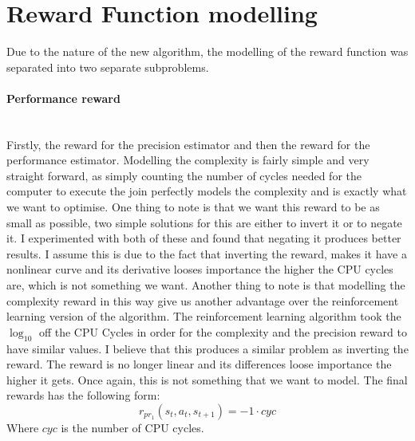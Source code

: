 \section{Reward Function modelling}
Due to the nature of the new algorithm, the modelling of the reward function was separated into two separate subproblems.
\paragraph{Performance reward}\mbox{}\\
Firstly, the reward for the precision estimator and then the reward for the performance estimator. Modelling the complexity is fairly simple and very straight forward, as simply counting the number of cycles needed for the computer to execute the join perfectly models the complexity and is exactly what we want to optimise. One thing to note is that we want this reward to be as small as possible, two simple solutions for this are either to invert it or to negate it. I experimented with both of these and found that negating it produces better results. I assume this is due to the fact that inverting the reward, makes it have a nonlinear curve and its derivative looses importance the higher the CPU cycles are, which is not something we want. Another thing to note is that modelling the complexity reward in this way give us another advantage over the reinforcement learning version of the algorithm. The reinforcement learning algorithm took the $\log_{10}$ off the CPU Cycles in order for the complexity and the precision reward to have similar values. I believe that this produces a similar problem as inverting the reward. The reward is no longer linear and its differences loose importance the higher it gets. Once again, this is not something that we want to model. The final rewards has the following form:
\begin{equation}
	r_{pr_1}(s_t,a_t,s_{t+1}) = -1 \cdot cyc
\end{equation}
Where $cyc$ is the number of CPU cycles.
